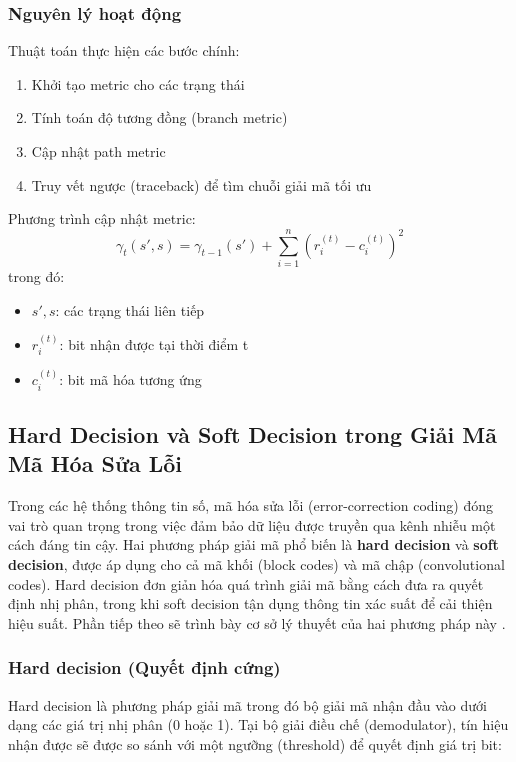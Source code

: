 \subsubsection*{Nguyên lý hoạt động}
Thuật toán thực hiện các bước chính:
\begin{enumerate}
	\item Khởi tạo metric cho các trạng thái
	\item Tính toán độ tương đồng (branch metric)
	\item Cập nhật path metric
	\item Truy vết ngược (traceback) để tìm chuỗi giải mã tối ưu
\end{enumerate}

Phương trình cập nhật metric:
\[
\gamma_t(s',s) = \gamma_{t-1}(s') + \sum_{i=1}^n (r_i^{(t)} - c_i^{(t)})^2
\]
trong đó:
\begin{itemize}[label=-]
	\item $s', s$: các trạng thái liên tiếp
	\item $r_i^{(t)}$: bit nhận được tại thời điểm t
	\item $c_i^{(t)}$: bit mã hóa tương ứng
\end{itemize}

\subsection{Hard Decision và Soft Decision trong Giải Mã Mã Hóa Sửa Lỗi}

Trong các hệ thống thông tin số, mã hóa sửa lỗi (error-correction coding) đóng vai trò quan trọng trong việc đảm bảo dữ liệu được truyền qua kênh nhiễu một cách đáng tin cậy. Hai phương pháp giải mã phổ biến là \textbf{hard decision} và \textbf{soft decision}, được áp dụng cho cả mã khối (block codes) và mã chập (convolutional codes). Hard decision đơn giản hóa quá trình giải mã bằng cách đưa ra quyết định nhị phân, trong khi soft decision tận dụng thông tin xác suất để cải thiện hiệu suất. Phần tiếp theo sẽ trình bày cơ sở lý thuyết của hai phương pháp này \cite{Clark1981}.

\subsubsection{Hard decision (Quyết định cứng)}
Hard decision là phương pháp giải mã trong đó bộ giải mã nhận đầu vào dưới dạng các giá trị nhị phân (0 hoặc 1). Tại bộ giải điều chế (demodulator), tín hiệu nhận được sẽ được so sánh với một ngưỡng (threshold) để quyết định giá trị bit:

